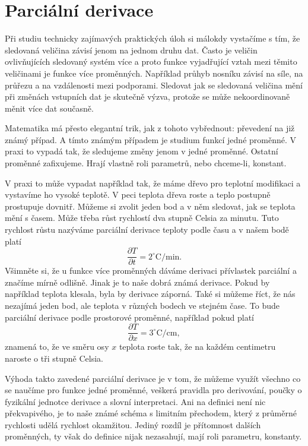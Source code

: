 \documentclass[12pt]{article}
\begin{document}
\newpage
\section*{Parciální derivace}

Při studiu technicky zajímavých praktických úloh si málokdy vystačíme s tím, že sledovaná veličina závisí jenom na jednom druhu dat. Často je veličin ovlivňujících sledovaný systém více a proto funkce vyjadřující vztah mezi těmito veličinami je funkce více proměnných. Například průhyb nosníku závisí na síle, na průřezu a na vzdálenosti mezi podporami. Sledovat jak se sledovaná veličina mění při změnách vstupních dat je skutečně výzva, protože se může nekoordinovaně měnit více dat současně.

Matematika má přesto elegantní trik, jak z tohoto vybřednout: převedení na již známý případ. A tímto známým případem je studium funkcí jedné proměnné. V praxi to vypadá tak, že sledujeme změny jenom v jedné proměnné. Ostatní proměnné zafixujeme. Hrají vlastně roli parametrů, nebo chceme-li, konstant.

V praxi to může vypadat například tak, že máme dřevo pro teplotní modifikaci a vystavíme ho vysoké teplotě. V peci teplota dřeva roste a teplo postupně prostupuje dovnitř. Můžeme si zvolit jeden bod a v něm sledovat, jak se teplota mění s časem. Může třeba růst rychlostí dva stupně Celsia za minutu. Tuto rychlost růstu nazýváme parciální derivace teploty podle času a v našem bodě platí $$\frac{\partial T}{\partial t}=2^{\circ}\mathrm C/\mathrm{min}.$$ Všimněte si, že u funkce více proměnných dáváme derivaci přívlastek parciální a značíme mírně odlišně. Jinak je to naše dobrá známá derivace. Pokud by například teplota klesala, byla by derivace záporná. Také si můžeme říct, že nás nezajímá jeden bod, ale teplota v různých bodech ve stejném čase. To bude parciální derivace podle prostorové proměnné, například pokud platí $$\frac{\partial T}{\partial x}=3^{\circ}\mathrm C/\mathrm{cm},$$ znamená to, že ve směru osy $x$ teplota roste tak, že na každém centimetru naroste o tři stupně Celsia.

Výhoda takto zavedené parciální derivace je v tom, že můžeme využít všechno co se naučíme pro funkce jedné proměnné, veškerá pravidla pro derivování, poučky o fyzikální jednotce derivace a slovní interpretaci. Ani na definici není nic překvapivého, je to naše známé schéma s limitním přechodem, který z průměrné rychlosti udělá rychlost okamžitou. Jediný rozdíl je přítomnost dalších proměnných, ty však do definice nijak nezasahují, mají roli parametru, konstanty.
\end{document}
